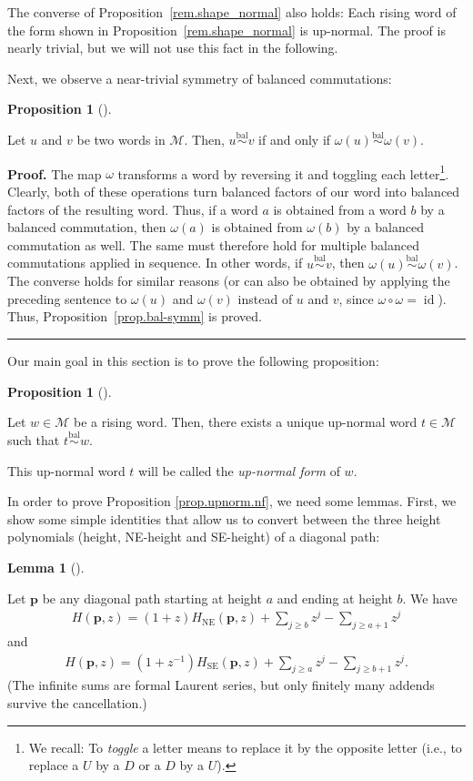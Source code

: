 \documentclass[numbers=enddot,12pt,final,onecolumn,notitlepage]{scrartcl}%
\theoremstyle{definition}
\newtheorem{lem}[theo]{Lemma}
\newenvironment{lemma}[1][]
{\begin{lem}[#1]\begin{leftbar}}
{\end{leftbar}\end{lem}}
\newtheorem{prop}[theo]{Proposition}
\newenvironment{proposition}[1][]
{\begin{prop}[#1]\begin{leftbar}}
{\end{leftbar}\end{prop}}
\newenvironment{proof}[1][Proof]{\noindent\textbf{#1.} }{\ \rule{0.5em}{0.5em}}
\newcommand{\id}{\operatorname{id}}
\newcommand{\M}{\mathcal{M}}
\newcommand{\pp}{\mathbf{p}}
\newcommand{\SE}{\operatorname{SE}}
\newcommand{\NE}{\operatorname{NE}}
\newcommand{\balsim}{\overset{\operatorname*{bal}}{\sim}}
\newcommand{\tup}[1]{\left( #1 \right)}
\begin{document}
The converse of Proposition~\ref{rem.shape_normal} also holds: Each rising word of the form shown in Proposition~\ref{rem.shape_normal} is up-normal. The proof is nearly trivial, but we will not use this fact in the following.
\medskip

Next, we observe a near-trivial symmetry of balanced commutations:

\begin{proposition}
    \label{prop.bal-symm}
    Let $u$ and $v$ be two words in $\M$.
    Then, $u \balsim v$ if and only if $\omega\tup{u} \balsim \omega\tup{v}$.
\end{proposition}

\begin{proof}
    The map $\omega$ transforms a word by reversing it and toggling each letter\footnote{We recall: To \emph{toggle} a letter means to replace it by the opposite letter (i.e., to replace a $U$ by a $D$ or a $D$ by a $U$).}.
    Clearly, both of these operations turn balanced factors of our word into balanced factors of the resulting word.
    Thus, if a word $a$ is obtained from a word $b$ by a balanced commutation, then $\omega\tup{a}$ is obtained from $\omega\tup{b}$ by a balanced commutation as well.
    The same must therefore hold for multiple balanced commutations applied in sequence.
    In other words, if $u \balsim v$, then $\omega\tup{u} \balsim \omega\tup{v}$.
    The converse holds for similar reasons (or can also be obtained by applying the preceding sentence to $\omega\tup{u}$ and $\omega\tup{v}$ instead of $u$ and $v$, since $\omega\circ\omega = \id$).
    Thus, Proposition~\ref{prop.bal-symm} is proved.
\end{proof}

Our main goal in this section is to prove the following proposition:

\begin{proposition}
\label{prop.upnorm.nf}
Let $w\in\M$ be a rising word. Then, there
exists a unique up-normal word $t\in\M$ such that
$t \balsim w$.
\end{proposition}

This up-normal word $t$ will be called the \emph{up-normal form} of $w$.

In order to prove Proposition \ref{prop.upnorm.nf}, we need some lemmas.
First, we show some simple identities that allow us to convert between the three height polynomials (height, NE-height and SE-height) of a diagonal path:

\begin{lemma}\label{lem:laurent}
Let $\pp$ be any diagonal path starting at height $a$ and ending at height $b$. We have
\begin{align}
    H(\pp,z) = (1+z)H_{\NE}(\pp,z) + \sum_{j \geq b} z^j - \sum_{j \geq a+1} z^j
    \label{eq.lem.laurent.NE}
\end{align}
and
\begin{align}
    H(\pp,z) = (1+z^{-1})H_{\SE}(\pp,z) + \sum_{j \geq a} z^j - \sum_{j \geq b+1} z^j.
    \label{eq.lem.laurent.SE}
\end{align}
(The infinite sums are formal Laurent series, but only finitely many addends survive the cancellation.)
\end{lemma}
\end{document}
